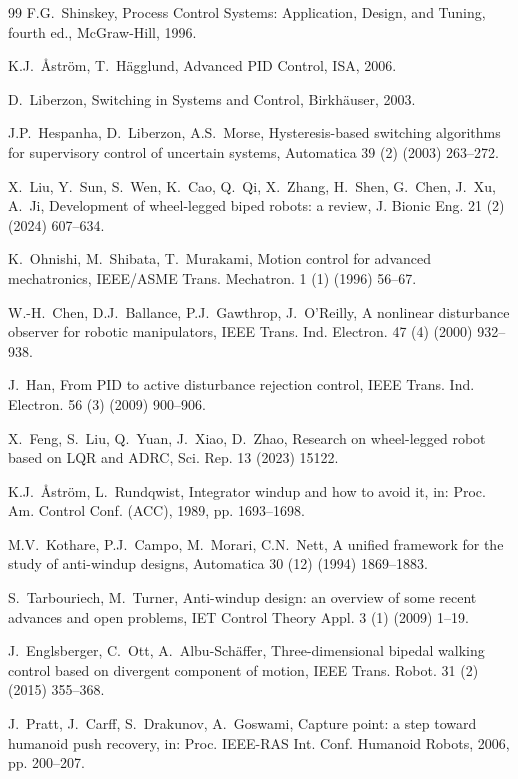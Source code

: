 \documentclass[a4paper,fleqn]{cas-dc}
\begin{document}
\begin{thebibliography}{99}
F.G.~Shinskey, Process Control Systems: Application, Design, and Tuning, fourth
ed., McGraw-Hill, 1996.

K.J.~\AA{}str\"{o}m, T.~H\"{a}gglund, Advanced PID Control, ISA, 2006.

D.~Liberzon, Switching in Systems and Control, Birkh\"{a}user, 2003.

J.P.~Hespanha, D.~Liberzon, A.S.~Morse, Hysteresis-based switching algorithms
for supervisory control of uncertain systems, Automatica 39 (2) (2003)
263--272.

X.~Liu, Y.~Sun, S.~Wen, K.~Cao, Q.~Qi, X.~Zhang, H.~Shen, G.~Chen, J.~Xu,
A.~Ji, Development of wheel-legged biped robots: a review, J. Bionic Eng. 21
(2) (2024) 607--634.

K.~Ohnishi, M.~Shibata, T.~Murakami, Motion control for advanced mechatronics,
IEEE/ASME Trans. Mechatron. 1 (1) (1996) 56--67.

W.-H.~Chen, D.J.~Ballance, P.J.~Gawthrop, J.~O'Reilly, A nonlinear disturbance
observer for robotic manipulators, IEEE Trans. Ind. Electron. 47 (4) (2000)
932--938.

J.~Han, From PID to active disturbance rejection control, IEEE Trans. Ind.
Electron. 56 (3) (2009) 900--906.

X.~Feng, S.~Liu, Q.~Yuan, J.~Xiao, D.~Zhao, Research on wheel-legged robot
based on LQR and ADRC, Sci. Rep. 13 (2023) 15122.

K.J.~\AA{}str\"{o}m, L.~Rundqwist, Integrator windup and how to avoid it, in:
Proc. Am. Control Conf. (ACC), 1989, pp. 1693--1698.

M.V.~Kothare, P.J.~Campo, M.~Morari, C.N.~Nett, A unified framework for the
study of anti-windup designs, Automatica 30 (12) (1994) 1869--1883.

S.~Tarbouriech, M.~Turner, Anti-windup design: an overview of some recent
advances and open problems, IET Control Theory Appl. 3 (1) (2009) 1--19.

J.~Englsberger, C.~Ott, A.~Albu-Sch\"{a}ffer, Three-dimensional bipedal walking
control based on divergent component of motion, IEEE Trans. Robot. 31 (2)
(2015) 355--368.

J.~Pratt, J.~Carff, S.~Drakunov, A.~Goswami, Capture point: a step toward
humanoid push recovery, in: Proc. IEEE-RAS Int. Conf. Humanoid Robots, 2006,
pp. 200--207.


\end{thebibliography}
\end{document}

